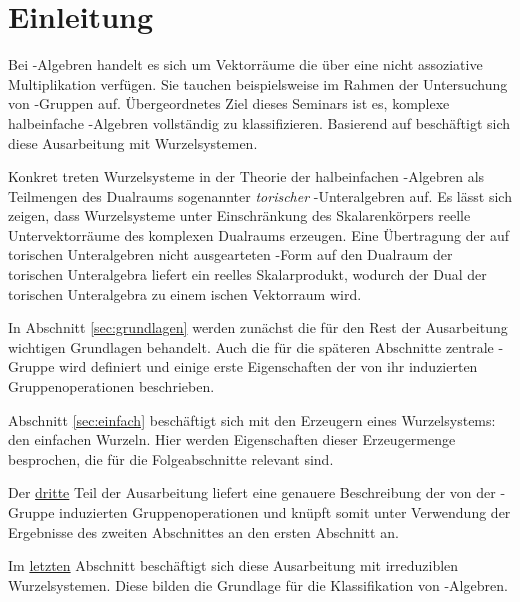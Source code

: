 \section*{Einleitung}

Bei \lie\hyp{}Algebren handelt es sich um Vektorräume die über eine nicht assoziative Multiplikation verfügen.
Sie tauchen beispielsweise im Rahmen der Untersuchung von \lie\hyp{}Gruppen auf.
Übergeordnetes Ziel dieses Seminars ist es, komplexe halbeinfache \lie\hyp{}Algebren vollständig zu klassifizieren.
Basierend auf \cite[S.49-55]{humphreys1972introduction} beschäftigt sich diese Ausarbeitung mit Wurzelsystemen.

Konkret treten Wurzelsysteme in der Theorie der halbeinfachen \lie\hyp{}Algebren als Teilmengen des Dualraums sogenannter \emph{torischer} \lie\hyp{}Unteralgebren auf.
Es lässt sich zeigen, dass Wurzelsysteme unter Einschränkung des Skalarenkörpers reelle Untervektorräume des komplexen Dualraums erzeugen.
Eine Übertragung der auf torischen Unteralgebren nicht ausgearteten \killing\hyp{}Form auf den Dualraum der torischen Unteralgebra liefert ein reelles Skalarprodukt, wodurch der Dual der torischen Unteralgebra zu einem \euklid ischen Vektorraum wird.

In Abschnitt \ref{sec:grundlagen} werden zunächst die für den Rest der Ausarbeitung wichtigen Grundlagen behandelt.
Auch die für die späteren Abschnitte zentrale \weyl\hyp{}Gruppe wird definiert und einige erste Eigenschaften der von ihr induzierten Gruppenoperationen beschrieben.

Abschnitt \ref{sec:einfach} beschäftigt sich mit den Erzeugern eines Wurzelsystems: den einfachen Wurzeln. 
Hier werden Eigenschaften dieser Erzeugermenge besprochen, die für die Folgeabschnitte relevant sind.

Der \hyperref[sec:weylgroup]{dritte} Teil der Ausarbeitung liefert eine genauere Beschreibung der von der \weyl\hyp{}Gruppe induzierten Gruppenoperationen und knüpft somit unter Verwendung der Ergebnisse des zweiten Abschnittes an den ersten Abschnitt an.

Im \hyperref[sec:irreduc]{letzten} Abschnitt beschäftigt sich diese Ausarbeitung mit irreduziblen Wurzelsystemen. 
Diese bilden die Grundlage für die Klassifikation von \lie\hyp{}Algebren.
